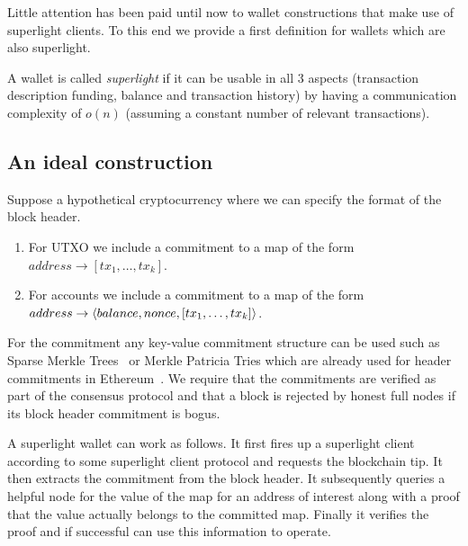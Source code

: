 Little attention has been paid until now to wallet constructions that make use of superlight clients. To this end we provide a first definition for wallets which are also superlight.

\begin{definition}
A wallet is called \emph{superlight} if it can be usable in all 3 aspects (transaction description funding, balance and transaction history) by having a communication complexity of $o(n)$ (assuming a constant number of relevant transactions).
\end{definition}

\subsection{An ideal construction}
\label{superlight-ideal}
Suppose a hypothetical cryptocurrency where we can specify the format of the block header.

\begin{enumerate}
    \item For UTXO we include a commitment to a map of the form $address \rightarrow [tx_1, \dots, tx_k]$.
    \item For accounts we include a commitment to a map of the form $address \rightarrow \langle balance, nonce, [tx_1, \dots, tx_k]\rangle$.
\end{enumerate}

For the commitment any key-value commitment structure can be used such as Sparse Merkle Trees~\cite{sparse-mt,revocation-transparency} or Merkle Patricia Tries which are already used for header commitments in Ethereum~\cite{wood2014ethereum}. We require that the commitments are verified as part of the consensus protocol and that a block is rejected by honest full nodes if its block header commitment is bogus.

A superlight wallet can work as follows. It first fires up a superlight client according to some superlight client protocol and requests the blockchain tip. It then extracts the commitment from the block header. It subsequently queries a helpful node for the value of the map for an address of interest along with a proof that the value actually belongs to the committed map. Finally it verifies the proof and if successful can use this information to operate.

